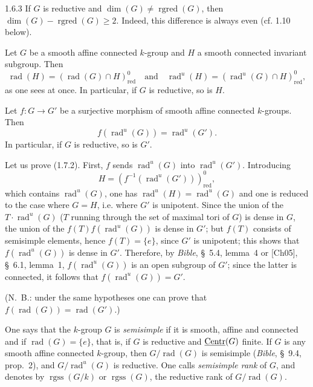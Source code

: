 \begin{remark}{1.6.3}\label{XIX.1.6.3}
If $G$ is reductive and $\dim(G)\ne\operatorname{rgred}(G)$, then $\dim(G)-\operatorname{rgred}(G)\geq2$. Indeed, this difference is always even (cf. 1.10 below).
\end{remark}

 Let $G$ be a smooth affine connected $k$-group and $H$ a smooth connected invariant subgroup. Then
\begin{equation}\tag{1.7.1}\label{XIX.eq.1.7.1}
\operatorname{rad}(H)=(\operatorname{rad}(G)\cap H)^0_{\mathrm{red}}
\quad\text{and}\quad
\operatorname{rad}^{u}(H)=(\operatorname{rad}^{u}(G)\cap H)^0_{\mathrm{red}},
\end{equation}
as one sees at once. In particular, if $G$ is reductive, so is $H$.

Let $f:G\to G'$ be a surjective morphism of smooth affine connected $k$-groups. Then
\begin{equation}\tag{1.7.2}\label{XIX.eq.1.7.2}
f(\operatorname{rad}^{u}(G))=\operatorname{rad}^{u}(G').
\end{equation}
In particular, if $G$ is reductive, so is $G'$.

Let us prove (1.7.2). First, $f$ sends $\operatorname{rad}^{u}(G)$ into $\operatorname{rad}^{u}(G')$. Introducing
\[H=(f^{-1}(\operatorname{rad}^{u}(G')))^0_{\mathrm{red}},\]
which contains $\operatorname{rad}^{u}(G)$, one has $\operatorname{rad}^{u}(H)=\operatorname{rad}^{u}(G)$ and one is reduced to the case where $G=H$, i.e. where $G'$ is unipotent. Since the union of the $T\cdot\operatorname{rad}^{u}(G)$ ($T$ running through the set of maximal tori of $G$) is dense in $G$, the union of the $f(T)f(\operatorname{rad}^{u}(G))$ is dense in $G'$; but $f(T)$ consists of semisimple elements, hence $f(T)=\{e\}$, since $G'$ is unipotent; this shows that $f(\operatorname{rad}^{u}(G))$ is dense in $G'$. Therefore, by \textit{Bible}, \S~5.4, lemma~4 or [Ch05], \S~6.1, lemma~1,{\renewcommand{\thefootnote}{(8)}} $f(\operatorname{rad}^{u}(G))$ is an open subgroup of $G'$; since the latter is connected, it follows that $f(\operatorname{rad}^{u}(G))=G'$.

(N.~B.: under the same hypotheses one can prove that $f(\operatorname{rad}(G))=\operatorname{rad}(G')$.)

 One says that the $k$-group $G$ is \emph{semisimple} if it is smooth, affine and connected and if $\operatorname{rad}(G)=\{e\}$, that is, if $G$ is reductive and $\underline{\mathrm{Centr}}(G)$ finite. If $G$ is any smooth affine connected $k$-group, then $G/\operatorname{rad}(G)$ is semisimple (\textit{Bible}, \S~9.4, prop.~2), and $G/\operatorname{rad}^{u}(G)$ is reductive. One calls \emph{semisimple rank} of $G$, and denotes by $\operatorname{rgss}(G/k)$ or $\operatorname{rgss}(G)$, the reductive rank of $G/\operatorname{rad}(G)$.

